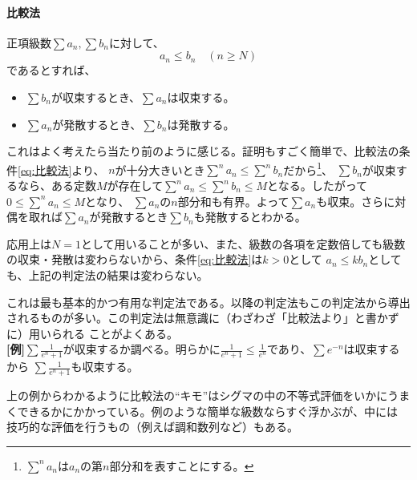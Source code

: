 \documentclass[a4j,dvipdfmx]{jsarticle}
\begin{document}
                \paragraph{比較法}正項級数$\sum a_n , \sum b_n$に対して、
                \begin{equation}
                    a_n \leq b_n \quad (n\geq N) \label{eq:比較法}
                \end{equation}
                であるとすれば、
                \begin{itemize}
                    \item $\sum b_n$が収束するとき、$\sum a_n$は収束する。
                    \item $\sum a_n$が発散するとき、$\sum b_n$は発散する。
                \end{itemize}
                これはよく考えたら当たり前のように感じる。証明もすごく簡単で、比較法の条件\eqref{eq:比較法}より、
                $n$が十分大きいとき$\sum^n a_n \leq \sum^n b_n$だから\footnote{$\sum^n a_n$は$a_n$の第$n$部分和を表すことにする。}、
                $\sum b_n$が収束するなら、ある定数$M$が存在して$\sum^n a_n \leq \sum^n b_n \leq M$となる。したがって$0\leq \sum^n a_n \leq M$となり、
                $\sum a_n$の$n$部分和も有界。よって$\sum a_n$も収束。さらに対偶を取れば$\sum a_n$が発散するとき$\sum b_n$も発散するとわかる。

                応用上は$N=1$として用いることが多い、また、級数の各項を定数倍しても級数の収束・発散は変わらないから、条件\eqref{eq:比較法}は$k>0$として
                $a_n \leq k b_n$としても、上記の判定法の結果は変わらない。

                これは最も基本的かつ有用な判定法である。以降の判定法もこの判定法から導出されるものが多い。この判定法は無意識に（わざわざ「比較法より」と書かずに）用いられる
                ことがよくある。\\

                \textbf{[例]}\hspace{1mm}$\displaystyle\sum \frac{1}{e^n + 1}$が収束するか調べる。明らかに$\displaystyle \frac{1}{e^n+1}\leq \frac{1}{e^n}$であり、$\sum e^{-n}$は収束するから
                $\displaystyle\sum \frac{1}{e^n+1}$も収束する。

                上の例からわかるように比較法の``キモ''はシグマの中の不等式評価をいかにうまくできるかにかかっている。例のような簡単な級数ならすぐ浮かぶが、中には
                技巧的な評価を行うもの（例えば調和数列など）もある。
\end{document}

